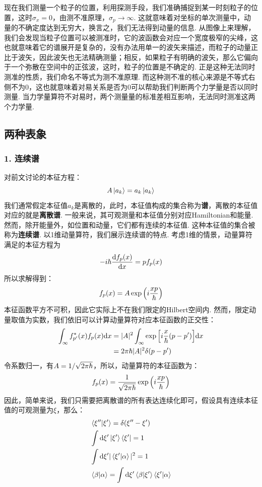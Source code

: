 现在我们测量一个粒子的位置，利用探测手段，我们准确捕捉到某一时刻粒子的位置，这时\(\sigma_{x}=0\)，由测不准原理，\(\sigma_{p}\to \infty\). 这就意味着对坐标的单次测量中，动量的不确定度达到无穷大，换言之，我们无法得到动量的信息. 从图像上来理解，我们会发现当粒子位置可以被测准时，它的波函数会对应一个宽度极窄的尖峰，这也就意味着它的谱展开是复杂的，没有办法用单一的波矢来描述，而粒子的动量正比于波矢，因此波矢也无法精确测量；相反，如果粒子有明确的波矢，那么它偏向于一个弥散在空间中的正弦波，这时，粒子的位置是不确定的. 正是这种无法同时测准的性质，我们命名不等式为测不准原理. 而这种测不准的核心来源是不等式右侧不为0，这也就意味着对易关系是否为0可以帮助我们判断两个力学量是否以同时测量. 当力学量算符不对易时，两个测量量的标准差相互影响，无法同时测准这两个力学量. 
\subsection{两种表象}
\subsubsection{1. 连续谱}
对前文讨论的本征方程：
\[
A\ket{a_{k}} = a_{k}\ket{a_{k}}
\]
我们通常假定本征值\(a_{k}\)是离散的，此时，本征值构成的集合称为\textbf{谱}，离散的本征值对应的就是\textbf{离散谱}. 一般来说，其可观测量和本征值分别对应Hamiltonian和能量. 然而，除开能量外，如位置和动量，它们都有连续的本征值. 这种本征值的集合被称为\textbf{连续谱}. 以1维动量算符，我们展示连续谱的特点. 考虑1维的情景，动量算符满足的本征方程为
\[
-i\hbar\frac{\dd f_{p}(x)}{\dd x} = pf_{p}(x)
\]
所以求解得到：
\[
f_{p}(x) = A\exp\Big(i\frac{xp}{\hbar}\Big)
\]
本征函数平方不可积，因此它实际上不在我们限定的Hilbert空间内. 然而，限定动量取值为实数，我们依旧可以计算动量算符对应本征函数的正交性：
\begin{align*}
\int_{\infty}f^{*}_{p'}(x)f_{p}(x)\dd x 
& = |A|^2\int_{\infty}\exp\Big[i\frac{x}{\hbar}(p-p')\Big]\dd x \\
& = 2\pi\hbar|A|^{2}\delta(p-p')
\end{align*}
令系数归一，有\(A = 1/\sqrt{2\pi\hbar}\)，所以，动量算符的本征函数为：
\[
f_{p}(x) = \frac{1}{\sqrt{2\pi\hbar}}\exp\Big(i\frac{xp}{\hbar}\Big)
\]
因此，简单来说，我们只需要把离散谱的所有表达连续化即可，假设具有连续本征值的可观测量为\(\xi\)，那么：
\begin{align*}
& \bra{\xi''}\ket{\xi'} = \delta(\xi''-\xi') \\
& \int\dd\xi'\ket{\xi'}\bra{\xi'} = 1 \\
& \int\dd\xi'|\bra{\xi'}\ket{\alpha}|^{2} = 1 \\
& \bra{\beta}\ket{\alpha} = \int\dd\xi' \bra{\beta}\ket{\xi'}\bra{\xi'}\ket{\alpha}
\end{align*}
